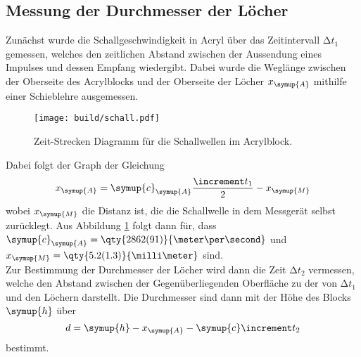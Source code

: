 \subsection{Messung der Durchmesser der Löcher}

Zunächst wurde die Schallgeschwindigkeit in Acryl über das Zeitintervall $\increment t_1$ gemessen, welches den zeitlichen
Abstand zwischen der Aussendung eines Impulses und dessen Empfang wiedergibt. Dabei wurde die Weglänge zwischen der 
Oberseite des Acrylblocks und der Oberseite der Löcher $x_{\symup{A}}$ mithilfe einer Schieblehre ausgemessen.
\begin{figure}[H]
    \texttt{[image: build/schall.pdf]}
    \centering
    \caption{Zeit-Strecken Diagramm für die Schallwellen im Acrylblock.}
    \label{fig:schall}
\end{figure}
Dabei folgt der Graph der Gleichung
\begin{equation}
    x_{\symup{A}}=\symup{c}_{\symup{A}} \frac{\increment t_1}{2}-x_{\symup{M}}
    \label{eqn:gerade}
\end{equation}
wobei $x_{\symup{M}}$ die Distanz ist, die die Schallwelle in dem Messgerät selbst zurücklegt.
Aus Abbildung \ref{fig:schall} folgt dann für, dass $\symup{c}_{\symup{A}}=\qty{2862(91)}{\meter\per\second}$ und
$x_{\symup{M}}=\qty{5.2(1.3)}{\milli\meter}$ sind.\\
Zur Bestimmung der Durchmesser der Löcher wird dann die Zeit $\increment t_2$ vermessen, welche den Abstand zwischen
der Gegenüberliegenden Oberfläche zu der von $\increment t_1$ und den Löchern darstellt.
Die Durchmesser sind dann mit der Höhe des Blocks $\symup{h}$ über
\begin{equation}
    d=\symup{h}-x_{\symup{A}}-\symup{c} \increment t_2
    \label{eqn:durchmesser}
\end{equation}
bestimmt.
